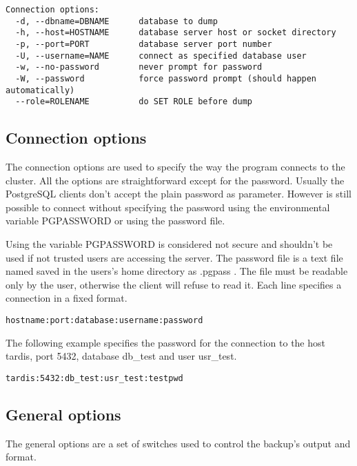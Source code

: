 \begin{verbatim}
Connection options:
  -d, --dbname=DBNAME      database to dump
  -h, --host=HOSTNAME      database server host or socket directory
  -p, --port=PORT          database server port number
  -U, --username=NAME      connect as specified database user
  -w, --no-password        never prompt for password
  -W, --password           force password prompt (should happen automatically)
  --role=ROLENAME          do SET ROLE before dump

\end{verbatim}

\subsection{Connection options}
The connection options are used to specify the way the program connects to the cluster. All the options are 
straightforward except for the password. Usually the PostgreSQL clients don't accept the plain password as 
parameter. However is still possible to connect without specifying the password using the 
environmental variable PGPASSWORD or using the password file.\newline

Using the variable PGPASSWORD is considered not secure and shouldn't be used if  not trusted users are 
accessing the server. The password file is a text file named saved in the users's home directory as 
.pgpass . The file must be readable only by the user, otherwise the client will refuse to read it.\newline
Each line specifies a connection in a fixed format.
\begin{verbatim}
hostname:port:database:username:password
\end{verbatim}

The following example specifies the password for the connection to the host tardis, port 5432, database 
db_test and user usr_test.

\begin{verbatim}
tardis:5432:db_test:usr_test:testpwd
\end{verbatim}

\subsection{General options}
The general options are a set of switches used to control the backup's output and format. 

